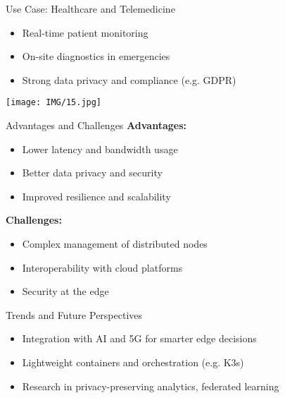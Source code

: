 \documentclass{beamer}
\begin{document}
\begin{frame}{Use Case: Healthcare and Telemedicine}
  \begin{itemize}
    \item Real-time patient monitoring
    \item On-site diagnostics in emergencies
    \item Strong data privacy and compliance (e.g. GDPR)
  \end{itemize}
  \vspace{0.5cm}
  \centering
  \texttt{[image: IMG/15.jpg]} %
\end{frame}

\begin{frame}{Advantages and Challenges}
  \textbf{Advantages:}
  \begin{itemize}
    \item Lower latency and bandwidth usage
    \item Better data privacy and security
    \item Improved resilience and scalability
  \end{itemize}
  \vspace{0.3cm}
  \textbf{Challenges:}
  \begin{itemize}
    \item Complex management of distributed nodes
    \item Interoperability with cloud platforms
    \item Security at the edge
  \end{itemize}
\end{frame}

\begin{frame}{Trends and Future Perspectives}
  \begin{itemize}
    \item Integration with AI and 5G for smarter edge decisions
    \item Lightweight containers and orchestration (e.g. K3s)
    \item Research in privacy-preserving analytics, federated learning
  \end{itemize}
\end{frame}
\end{document}
